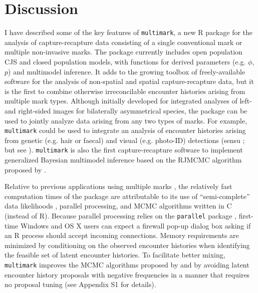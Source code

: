 \documentclass[12pt]{article}
\begin{document}
\section{Discussion}
I have described some of the key features of \verb|multimark|, a new R package for the analysis of capture-recapture data consisting of a single conventional mark or multiple non-invasive marks. The package currently includes open population CJS and closed population models, with functions for derived parameters (e.g. $\phi$, $p$) and multimodel inference. It adds to the growing toolbox of freely-available software for the analysis of non-spatial \citep[e.g.][]{WhiteBurnham1999,ChoquetEtAl2009,Laake2013,LaakeEtAl2013} and spatial \citep[e.g.][]{GopalaswamyEtAl2012,Efford2015} capture-recapture data, but it is the first to combine otherwise irreconcilable encounter histories arising from multiple mark types. Although initially developed for integrated analyses of left- and right-sided images for bilaterally asymmetrical species, the package can be used to jointly analyze data arising from any two types of marks. For example, \verb|multimark| could be used to integrate an analysis of encounter histories arising from genetic (e.g. hair or faecal) and visual (e.g. photo-ID) detections (sensu \citealt{MadonEtAl2011}; but see \citealt{Bonner2013}).  \verb|multimark| is also the first capture-recapture software to implement generalized Bayesian multimodel inference based on the RJMCMC algorithm proposed by \cite{BarkerLink2013}.

Relative to previous applications using multiple marks \citep{BonnerHolmberg2013,McClintockEtAl2013a}, the relatively fast computation times of the package are attributable to its use of ``semi-complete'' data likelihoods \citep{KingEtAl2015}, parallel processing, and MCMC algorithms written in C (instead of R). Because parallel processing relies on the \verb|parallel| package \citep{RTeam2013}, first-time Windows and OS X users can expect a firewall pop-up dialog box asking if an R process should accept incoming connections. Memory requirements are minimized by conditioning on the observed encounter histories when identifying the feasible set of latent encounter histories. To facilitate better mixing, \verb|multimark| improves the MCMC algorithms proposed by \cite{BonnerHolmberg2013} and \cite{McClintockEtAl2013a,McClintockEtAl2014} by avoiding latent encounter history proposals with negative frequencies in a manner that requires no proposal tuning (see Appendix S1 for details).
\end{document}
